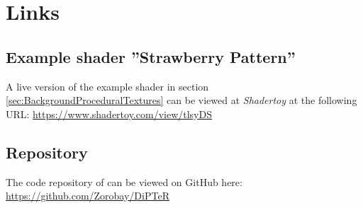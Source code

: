 \chapter{Links}

\section{Example shader ''Strawberry Pattern''}\label{sec:AppendixLinkToStrawberryPatternAtShadertoy}

A live version of the example shader in section \ref{sec:BackgroundProceduralTextures} can be viewed at \textit{Shadertoy} at the following URL: \url{https://www.shadertoy.com/view/tlsyDS}

\section{\dipter{} Repository}

The code repository of \dipter{} can be viewed on GitHub here: \url{https://github.com/Zorobay/DiPTeR}
